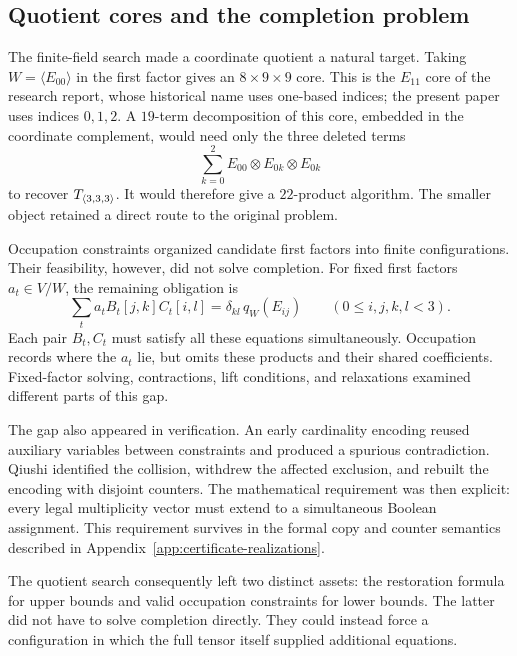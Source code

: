 \subsection{Quotient cores and the completion problem}
The finite-field search made a coordinate quotient a natural target.
Taking $W=\langle E_{00}\rangle$ in the first factor gives an
$8\times9\times9$ core. This is the $E_{11}$ core of the research
report, whose historical name uses one-based indices; the present
paper uses indices $0,1,2$. A $19$-term decomposition of this core,
embedded in the coordinate complement, would need only the three
deleted terms
\begin{equation}\label{eq:core-restoration}
 \sum_{k=0}^2 E_{00}\otimes E_{0k}\otimes E_{0k}
\end{equation}
to recover $T_{\langle3,3,3\rangle}$. It would therefore give a $22$-product algorithm.
The smaller object retained a direct route to the original problem.

Occupation constraints organized candidate first factors into finite
configurations. Their feasibility, however, did not solve completion.
For fixed first factors $a_t\in V/W$, the remaining obligation is
\begin{equation}\label{eq:core-completion}
 \sum_t a_t B_t[j,k]C_t[i,l]
   =\delta_{kl}\,q_W(E_{ij})
 \qquad(0\leq i,j,k,l<3).
\end{equation}
Each pair $B_t,C_t$ must satisfy all these equations simultaneously.
Occupation records where the $a_t$ lie, but omits these products and
their shared coefficients. Fixed-factor solving, contractions, lift
conditions, and relaxations examined different parts of this gap.

The gap also appeared in verification. An early cardinality encoding
reused auxiliary variables between constraints and produced a
spurious contradiction. Qiushi identified the collision, withdrew the
affected exclusion, and rebuilt the encoding with disjoint counters.
The mathematical requirement was then explicit: every legal
multiplicity vector must extend to a simultaneous Boolean assignment.
This requirement survives in the formal copy and counter semantics
described in Appendix~\ref{app:certificate-realizations}.

The quotient search consequently left two distinct assets: the
restoration formula for upper bounds and valid occupation constraints
for lower bounds. The latter did not have to solve completion directly.
They could instead force a configuration in which the full tensor
itself supplied additional equations.

